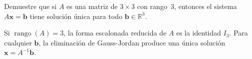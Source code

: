 \documentclass{emate-ucr}
\begin{document}
\begin{ejercicio}[25]
  Demuestre que si $A$ es una matriz de $3\times 3$ con rango~$3$, entonces el
  sistema $A\mathbf{x} = \mathbf{b}$ tiene solución única para todo
  $\mathbf{b} \in \mathbb{R}^3$.

  \begin{solucion}
    Si $\operatorname{rango}(A) = 3$, la forma escalonada reducida de $A$ es la
    identidad $I_3$. Para cualquier $\mathbf{b}$, la eliminación de Gauss-Jordan
    produce una única solución $\mathbf{x} = A^{-1}\mathbf{b}$.
  \end{solucion}
\end{ejercicio}
\end{document}
